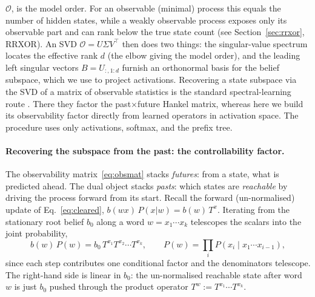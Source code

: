 \documentclass[11pt]{article}
\begin{document}
$\mathcal{O}$, is the model order. For an observable (minimal) process this equals the number 
of hidden states, while a weakly observable process exposes only its observable part and can rank 
below the true state count (see Section~\ref{sec:rrxor}, RRXOR). An SVD $\mathcal{O}=U\Sigma V^\top$ 
then does two things: the singular-value spectrum locates the effective rank $d$ (the elbow giving 
the model order), and the leading left singular vectors $B=U_{:,1:d}$ furnish an orthonormal basis for the
belief subspace, which we use to project activations. 
Recovering a state subspace via the SVD of a matrix of observable statistics is the standard spectral-learning 
route \cite{hsu2012, thon2015}. There they factor the past$\times$future Hankel matrix, whereas 
here we build its observability factor directly from learned operators in activation space. 
The procedure uses only activations, softmax, and the prefix tree.

\paragraph{Recovering the subspace from the past: the controllability factor.}
The observability matrix~\eqref{eq:obsmat} stacks \emph{futures}: from a state, what is
predicted ahead. The dual object stacks \emph{pasts}: which states are \emph{reachable} by
driving the process forward from its start. Recall the forward (un-normalised) update of
Eq.~\eqref{eq:cleared}, $b(wx)\,P(x|w)=b(w)\,T^x$. Iterating from the stationary root belief
$b_0$ along a word $w=x_1\cdots x_k$ telescopes the scalars into the joint probability,
\begin{equation}
b(w)\,P(w)=b_0\,T^{x_1}T^{x_2}\cdots T^{x_k},
\qquad P(w)=\textstyle\prod_{i} P(x_i\mid x_1\cdots x_{i-1}),
\label{eq:reach}
\end{equation}
since each step contributes one conditional factor and the denominators telescope. The
right-hand side is linear in $b_0$: the un-normalised reachable state after word $w$ is just
$b_0$ pushed through the product operator $T^{w}:=T^{x_1}\!\cdots T^{x_k}$.
\end{document}
